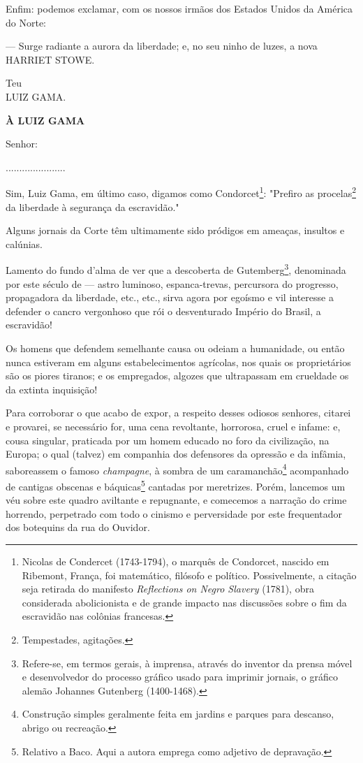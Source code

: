Enfim: podemos exclamar, com os nossos irmãos dos Estados Unidos da
América do Norte:

--- Surge radiante a aurora da liberdade; e, no seu ninho de luzes, a
nova HARRIET STOWE.

Teu\\
LUIZ GAMA.

\textbf{À LUIZ GAMA}

Senhor:

......................

Sim, Luiz Gama, em último caso, digamos como Condorcet\footnote{
  Nicolas de Condercet (1743-1794), o marquês de Condorcet, nascido em
  Ribemont, França, foi matemático, filósofo e político. Possivelmente,
  a citação seja retirada do manifesto \emph{Reflections on Negro
  Slavery} (1781), obra considerada abolicionista e de grande impacto
  nas discussões sobre o fim da escravidão nas colônias francesas.}:
"Prefiro as procelas\footnote{Tempestades, agitações.} da liberdade à
segurança da escravidão."

Alguns jornais da Corte têm ultimamente sido pródigos em ameaças,
insultos e calúnias.

Lamento do fundo d'alma de ver que a descoberta de Gutemberg\footnote{
  Refere-se, em termos gerais, à imprensa, através do inventor da prensa
  móvel e desenvolvedor do processo gráfico usado para imprimir jornais,
  o gráfico alemão Johannes Gutenberg (1400-1468).}, denominada por este
século de --- astro luminoso, espanca-trevas, percursora do progresso,
propagadora da liberdade, etc., etc., sirva agora por egoísmo e vil
interesse a defender o cancro vergonhoso que rói o desventurado Império
do Brasil, a escravidão!

Os homens que defendem semelhante causa ou odeiam a humanidade, ou então
nunca estiveram em alguns estabelecimentos agrícolas, nos quais os
proprietários são os piores tiranos; e os empregados, algozes que
ultrapassam em crueldade os da extinta inquisição!

Para corroborar o que acabo de expor, a respeito desses odiosos
senhores, citarei e provarei, se necessário for, uma cena revoltante,
horrorosa, cruel e infame: e, cousa singular, praticada por um homem
educado no foro da civilização, na Europa; o qual (talvez) em companhia
dos defensores da opressão e da infâmia, saboreassem o famoso
\emph{champagne}, à sombra de um caramanchão\footnote{Construção
  simples geralmente feita em jardins e parques para descanso, abrigo ou
  recreação.} acompanhado de cantigas obscenas e báquicas\footnote{
  Relativo a Baco. Aqui a autora emprega como adjetivo de depravação.}
cantadas por meretrizes. Porém, lancemos um véu sobre este quadro
aviltante e repugnante, e comecemos a narração do crime horrendo,
perpetrado com todo o cinismo e perversidade por este frequentador dos
botequins da rua do Ouvidor.

